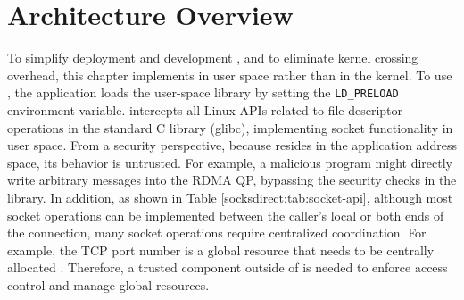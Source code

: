 \section{Architecture Overview}
\label{socksdirect:sec:architecture}

To simplify deployment and development \cite {andromeda}, and to eliminate kernel crossing overhead, this chapter implements \sys{} in user space rather than in the kernel.
To use \sys{}, the application loads the user-space library \libipc {} by setting the \texttt {LD\_PRELOAD} environment variable. \libipc {} intercepts all Linux APIs related to file descriptor operations in the standard C library (glibc), implementing socket functionality in user space.
From a security perspective, because \libipc {} resides in the application address space, its behavior is untrusted. For example, a malicious program might directly write arbitrary messages into the RDMA QP, bypassing the security checks in the \libipc{} library.
In addition, as shown in Table \ref{socksdirect:tab:socket-api}, although most socket operations can be implemented between the caller's local or both ends of the connection, many socket operations require centralized coordination. For example, the TCP port number is a global resource that needs to be centrally allocated \cite {lin2016scalable,nsdi19freeflow}. Therefore, a trusted component outside of \libipc {} is needed to enforce access control and manage global resources.

